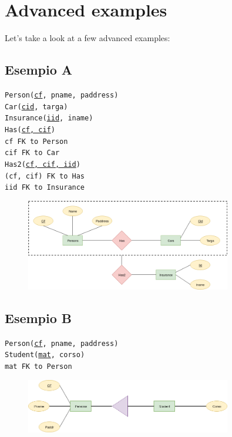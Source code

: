 \documentclass[class=book, crop=false, oneside]{standalone}
\newcommand\tab[1][1cm]{\hspace*{#1}}
\begin{document}
\section{Advanced examples}
Let's take a look at a few advanced examples:\\
\subsection*{Esempio A}
\texttt{Person(\underline{cf}, pname, paddress)}\\
\texttt{Car(\underline{cid}, targa)}\\
\texttt{Insurance(\underline{iid}, iname)}\\
\texttt{Has(\underline{cf, cif})}\\
\tab[.4cm] \texttt{cf FK to Person}\\
\tab[.4cm] \texttt{cif FK to Car}\\
\texttt{Has2(\underline{cf, cif, iid})}\\
\tab[.4cm] \texttt{(cf, cif) FK to Has}\\
\tab[.4cm] \texttt{iid FK to Insurance}

\begin{figure}[H]
	\includegraphics[width=0.8\textwidth,keepaspectratio]{diagram6_00.png}
	\caption{}
	\label{diagram6_00}
\end{figure}

\subsection*{Esempio B}
\texttt{Person(\underline{cf}, pname, paddress)}\\
\texttt{Student(\underline{mat}, corso)}\\
\tab[.4cm] \texttt{mat FK to Person}

\begin{figure}[H]
	\includegraphics[width=0.8\textwidth,keepaspectratio]{diagram6_01.png}
	\caption{}
	\label{diagram6_01}
\end{figure}
\end{document}
